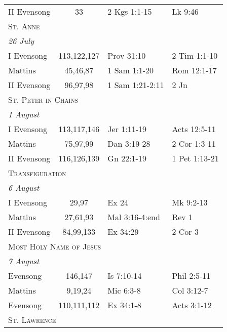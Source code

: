 \begin{longtable}{l c l l}
\hspace{1em} II Evensong&33&2 Kgs 1:1-15&Lk 9:46\\
\multicolumn{4}{l}{\textsc{St. Anne}}\\
\multicolumn{4}{l}{\textit{26 July}}\\
\hspace{1em} I Evensong&113,122,127&Prov 31:10&2 Tim 1:1-10\\
\hspace{1em} Mattins&45,46,87&1 Sam 1:1-20&Rom 12:1-17\\
\hspace{1em} II Evensong&96,97,98&1 Sam 1:21-2:11&2 Jn\\
%
\multicolumn{4}{l}{\textsc{St. Peter in Chains}}\\
\multicolumn{4}{l}{\textit{1 August}}\\
\hspace{1em} I Evensong&113,117,146&Jer 1:11-19&Acts 12:5-11\\
\hspace{1em} Mattins&75,97,99&Dan 3:19-28&2 Cor 1:3-11\\
\hspace{1em} II Evensong&116,126,139&Gn 22:1-19&1 Pet 1:13-21\\
%
\multicolumn{4}{l}{\textsc{Transfiguration}}\\
\multicolumn{4}{l}{\textit{6 August}}\\
\hspace{1em} I Evensong&29,97&Ex 24&Mk 9:2-13\\
\hspace{1em} Mattins&27,61,93&Mal 3:16-4:end&Rev 1\\
\hspace{1em} II Evensong&84,99,133&Ex 34:29&2 Cor 3\\
%
\multicolumn{4}{l}{\textsc{Most Holy Name of Jesus}}\\
\multicolumn{4}{l}{\textit{7 August}}\\
\hspace{1em} Evensong&146,147&Is 7:10-14&Phil 2:5-11\\
\hspace{1em} Mattins&9,19,24&Mic 6:3-8&Col 3:12-7\\
\hspace{1em} Evensong&110,111,112&Ex 34:1-8&Acts 3:1-12\\
%
\multicolumn{4}{l}{\textsc{St. Lawrence}}\\

\end{longtable}
